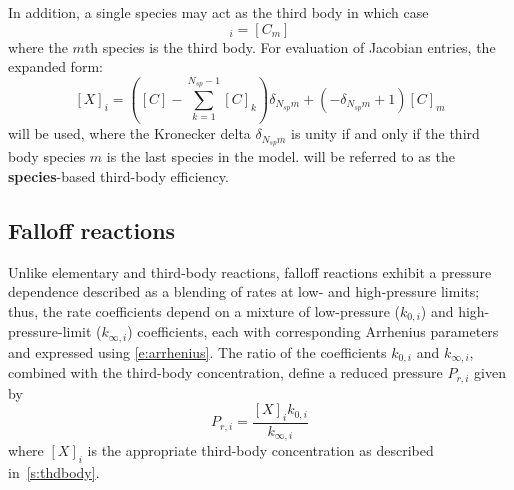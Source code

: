 \documentclass[12pt]{article}
\newcommand{\ns}{N_{sp}}
\begin{document}
In addition, a single species may act as the third body in which case
\begin{equation}
 [X]_{i} = [C_m]
\end{equation}
where the $m$th species is the third body.
For evaluation of Jacobian entries, the expanded form:
\begin{equation}
\label{e:thd_spec}
 [X]_{i}=\left([C] - \sum_{k=1}^{\ns  - 1} [C]_{k}\right) \delta_{\ns m} + \left(- \delta_{\ns m} + 1\right) [C]_{m}
\end{equation}
will be used, where the Kronecker delta $\delta_{\ns m}$ is unity if and only if the third body species $m$ is the last species in the model.
 will be referred to as the \textbf{species}-based third-body efficiency.


\subsection{Falloff reactions}
Unlike elementary and third-body reactions, falloff reactions exhibit a pressure dependence described as a blending of rates at low- and high-pressure limits; thus, the rate coefficients depend on a mixture of low-pressure ($k_{0, i}$) and high-pressure-limit ($k_{\infty,i}$) coefficients, each with corresponding Arrhenius parameters and expressed using \cref{e:arrhenius}.
The ratio of the coefficients $k_{0, i}$ and $k_{\infty, i}$, combined with the third-body concentration, define a reduced pressure $P_{r,i}$ given by
\begin{equation}
 \label{e:pr}
 P_{r, i}=\frac{[X]_{i} k_{0, i}}{k_{\infty, i}}
\end{equation}
where $[X]_{i}$ is the appropriate third-body concentration as described in~\cref{s:thdbody}.
\end{document}
